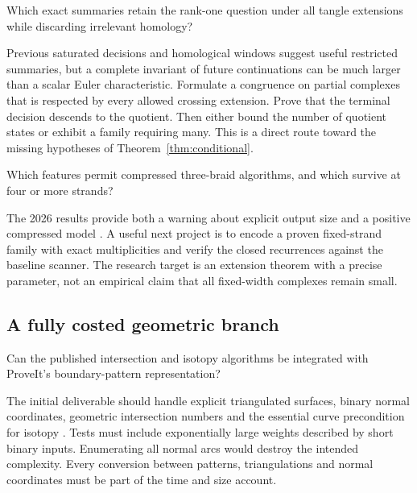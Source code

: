 \begin{question}
Which exact summaries retain the rank-one question under all tangle
extensions while discarding irrelevant homology?
\end{question}

Previous saturated decisions and homological windows suggest useful
restricted summaries, but a complete invariant of future continuations can
be much larger than a scalar Euler characteristic. Formulate a congruence
on partial complexes that is respected by every allowed crossing extension.
Prove that the terminal decision descends to the quotient. Then either
bound the number of quotient states or exhibit a family requiring many.
This is a direct route toward the missing hypotheses of
Theorem~\ref{thm:conditional}.

\begin{question}
Which features permit compressed three-braid algorithms, and which survive
at four or more strands?
\end{question}

The 2026 results provide both a warning about explicit output size and a
positive compressed model \cite{kelomaki2026}. A useful next project is to
encode a proven fixed-strand family with exact multiplicities and verify
the closed recurrences against the baseline scanner.
The research target is an extension theorem with a precise parameter,
not an empirical claim that all fixed-width complexes remain small.

\subsection{A fully costed geometric branch}

\begin{question}
Can the published intersection and isotopy algorithms be integrated with
ProveIt's boundary-pattern representation?
\end{question}

The initial deliverable should handle explicit triangulated surfaces,
binary normal coordinates, geometric intersection numbers and the essential
curve precondition for isotopy \cite{lackenbycurves2026}.
Tests must include exponentially large weights described by short binary
inputs. Enumerating all normal arcs would destroy the intended complexity.
Every conversion between patterns, triangulations and normal coordinates
must be part of the time and size account.

